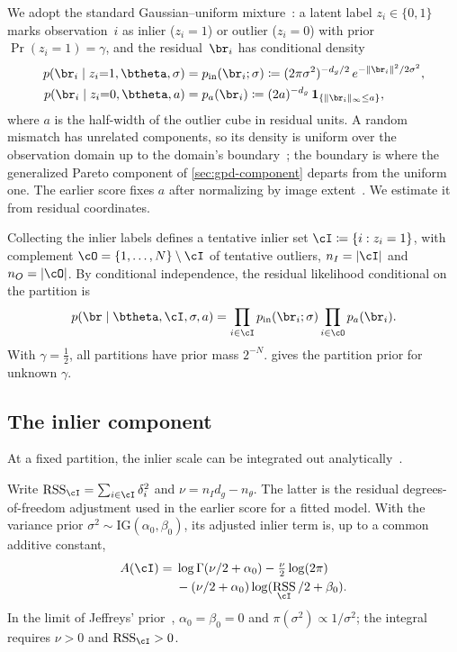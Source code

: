 \documentclass[10pt,twocolumn,letterpaper]{article}
\DeclareMathOperator{\RSS}{RSS}
\newcommand{\IG}{\mathrm{IG}}
\newcommand{\pin}{p_{\mathrm{in}}}
\newcommand{\gaussunif}{Gaussian--uniform\xspace}
\newcommand{\tinlier}{tentative inlier\xspace}
\newcommand{\toutliers}{tentative outliers\xspace}
\begin{document}
We adopt the standard \gaussunif
mixture~\cite{Torr2000,Shekhovtsov2025}: a latent label
$z_i \in \{0,1\}$ marks observation~$i$ as inlier ($z_i{=}1$) or outlier
($z_i{=}0$) with prior $\Pr(z_i{=}1) = \gamma$, and the
residual~$\br_i$ has conditional density
\begin{equation}
 \begin{aligned}
 p(\br_i \mid z_i{=}1, \btheta, \sigma) &= \pin(\br_i;\sigma)
   \coloneqq (2\pi\sigma^2)^{-d_g/2}\,e^{-\|\br_i\|^2/2\sigma^2},\\
 p(\br_i \mid z_i{=}0, \btheta, a) &= p_a(\br_i) \coloneqq (2a)^{-d_g}\,\mathbf{1}_{\{\|\br_i\|_\infty\le a\}},
 \end{aligned}
 \label{eq:component-densities}
\end{equation}
where $a$ is the half-width of the outlier cube in residual units. A
random mismatch has unrelated components, so its density is uniform over
the observation domain up to the domain's
boundary~\cite[Sec.~3.2.2]{Shekhovtsov2025}; the boundary is where the
generalized Pareto component of \cref{sec:gpd-component} departs from
the uniform one.
The earlier score fixes $a$ after normalizing by image
extent~\cite{Pritts2026}. We estimate it from residual coordinates.

Collecting the inlier labels defines a \tinlier set
$\cI \coloneqq \{i : z_i = 1\}$, with complement
$\cO = \{1,\ldots,N\}\setminus\cI$ of \toutliers, $n_I = |\cI|$ and
$n_O = |\cO|$. By conditional independence, the residual likelihood conditional on the partition is
\begin{equation}
 p(\br\mid\btheta,\cI,\sigma,a)
 =\prod_{i\in\cI}\pin(\br_i;\sigma)
  \prod_{i\in\cO}p_a(\br_i).
 \label{eq:partition-likelihood}
\end{equation}
With $\gamma=\tfrac12$, all partitions have prior mass $2^{-N}$.
 gives the partition prior for unknown $\gamma$.

\subsection{The inlier component}
\label{sec:evpm}
\label{sec:inlier}

At a fixed partition, the inlier scale can be integrated out
analytically~\cite{Pritts2026}.

Write $\RSS_\cI=\sum_{i\in\cI}\delta_i^2$ and
$\nu=n_I d_g-n_\theta$. The latter is the residual degrees-of-freedom
adjustment used in the earlier score for a fitted model. With the variance prior $\sigma^2\sim\IG(\alpha_0,\beta_0)$, its adjusted inlier term
is, up to a common additive constant,
\begin{equation}
 \begin{aligned}
 A(\cI)={}&\log\Gamma(\nu/2+\alpha_0)-\tfrac{\nu}{2}\log(2\pi)\\
 &-(\nu/2+\alpha_0)\log(\RSS_\cI/2+\beta_0).
 \end{aligned}
 \label{eq:evpm}
\end{equation}
In the limit of Jeffreys' prior~\cite{Jeffreys1946}, $\alpha_0=\beta_0=0$ and
$\pi(\sigma^2)\propto1/\sigma^2$; the integral requires $\nu>0$
and $\RSS_\cI>0$.
\end{document}
